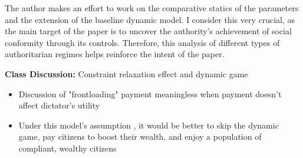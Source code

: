 \documentclass[10pt]{article}    %
\begin{document}
The author makes an effort to work on the comparative statics of the parameters and the extension of the baseline dynamic model. I consider this very crucial, as the main target of the paper is to uncover the authority’s achievement of social conformity through its controls. Therefore, this analysis of different types of authoritarian regimes helps reinforce the intent of the paper. 

\pagebreak
\textbf{Class Discussion:} Constraint relaxation effect and dynamic game \\
\begin{itemize}
    \item Discussion of "frontloading" payment meaningless when payment doesn't affect dictator's utility
    \item Under this model's assumption , it would be better to skip the dynamic game, pay citizens to boost their wealth, and enjoy a population of compliant, wealthy citizens
\end{itemize}
\end{document}
